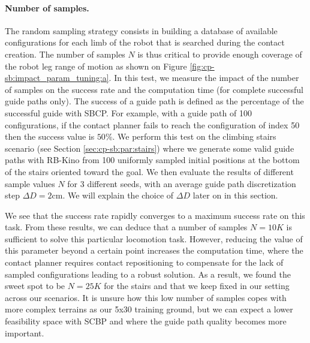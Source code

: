 \paragraph{Number of samples.}
The random sampling strategy consists in building a database of available configurations for each limb of the robot that is searched during the contact creation.
The number of samples $N$ is thus critical to provide enough coverage of the robot leg range of motion as shown on Figure \ref{fig:cp-sb:impact_param_tuning:a}.
In this test, we measure the impact of the number of samples on the success rate and the computation time (for complete successful guide paths only).
The success of a guide path is defined as the percentage of the successful guide with SBCP. For example, with a guide path of 100 configurations, if the contact planner fails to reach the configuration of index 50 then the success value is $50$\%.
We perform this test on the climbing stairs scenario (see Section \ref{sec:cp-sb:par:stairs}) where we generate some valid guide paths with RB-Kino from 100 uniformly sampled initial positions at the bottom of the stairs oriented toward the goal. 
We then evaluate the results of different sample values $N$ for 3 different seeds, with an average guide path discretization step $\Delta D = 2$cm. 
We will explain the choice of $\Delta D$ later on in this section.

We see that the success rate rapidly converges to a maximum success rate on this task. From these results, we can deduce that a number of samples $N=10K$ is sufficient to solve this particular locomotion task. 
However, reducing the value of this parameter beyond a certain point increases the computation time, where the contact planner requires contact repositioning to compensate for the lack of sampled configurations leading to a robust solution.
As a result, we found the sweet spot to be $N=25K$ for the stairs and that we keep fixed in our setting across our scenarios. 
It is unsure how this low number of samples copes with more complex terrains as our 5x30 training ground, but we can expect a lower feasibility space with SCBP and where the guide path quality becomes more important.


